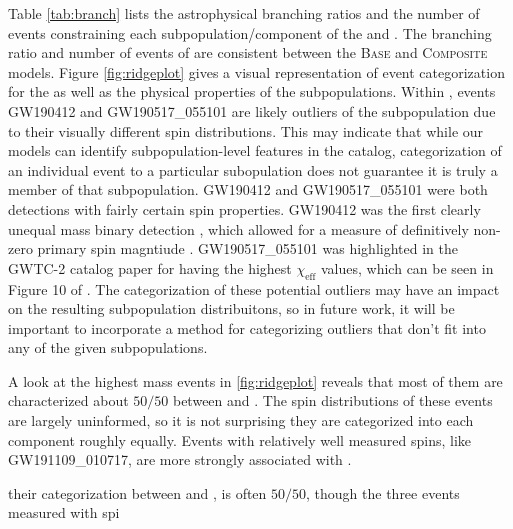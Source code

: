 Table \ref{tab:branch} lists the astrophysical branching ratios and the number of events constraining each subpopulation/component of the \base{} and \comp{}. The branching ratio and number of events of \first{} are consistent between the \textsc{Base} and \textsc{Composite} models. Figure \ref{fig:ridgeplot} gives a visual representation of event categorization for the \comp{} as well as the physical properties of the subpopulations. Within \contA{}, events GW190412 and GW190517\_055101 are likely outliers of the subpopulation due to their visually different spin distributions. This may indicate that while our models can identify subpopulation-level features in the catalog, categorization of an individual event to a particular subopulation does not guarantee it is truly a member of that subpopulation. GW190412 and GW190517\_055101 were both detections with fairly certain spin properties. GW190412 was the first clearly unequal mass binary detection , which allowed for a measure of definitively non-zero primary spin magntiude . GW190517\_055101 was highlighted in the GWTC-2 catalog paper  for having the highest $\chi_\text{eff}$ values, which can be seen in Figure 10 of . The categorization of these potential outliers may have an impact on the resulting subpopulation distribuitons, so in future work, it will be important to incorporate a method for categorizing outliers that don't fit into any of the given subpopulations. 

A look at the highest mass events in \ref{fig:ridgeplot} reveals that most of them are characterized about $50/50$ between \contA{} and \contB{}. The spin distributions of these events are largely uninformed, so it is not surprising they are categorized into each component roughly equally. Events with relatively well measured spins, like GW191109\_010717, are more strongly associated with \contB{}.

their categorization between \contA{} and \contB{}, is often $50/50$, though the three events measured with spi


